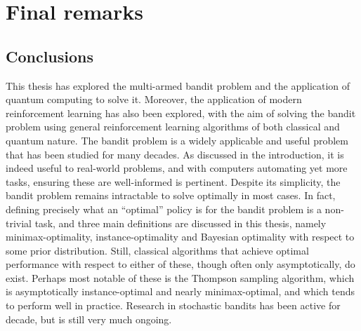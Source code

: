 \chapter{Final remarks}
\label{chap:final}

\section{Conclusions}
This thesis has explored the multi-armed bandit problem and the application of quantum computing to solve it.
Moreover, the application of modern reinforcement learning has also been explored, with the aim of solving the bandit problem using general reinforcement learning algorithms of both classical and quantum nature.
The bandit problem is a widely applicable and useful problem that has been studied for many decades.
As discussed in the introduction, it is indeed useful to real-world problems, and with computers automating yet more tasks, ensuring these are well-informed is pertinent.
Despite its simplicity, the bandit problem remains intractable to solve optimally in most cases.
In fact, defining precisely what an \enquote{optimal} policy is for the bandit problem is a non-trivial task, and three main definitions are discussed in this thesis, namely minimax-optimality, instance-optimality and Bayesian optimality with respect to some prior distribution.
Still, classical algorithms that achieve optimal performance with respect to either of these, though often only asymptotically, do exist.
Perhaps most notable of these is the Thompson sampling algorithm, which is asymptotically instance-optimal and nearly minimax-optimal, and which tends to perform well in practice.
Research in stochastic bandits has been active for decade, but is still very much ongoing.

